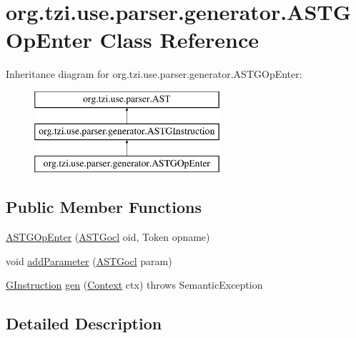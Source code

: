 \hypertarget{classorg_1_1tzi_1_1use_1_1parser_1_1generator_1_1_a_s_t_g_op_enter}{\section{org.\-tzi.\-use.\-parser.\-generator.\-A\-S\-T\-G\-Op\-Enter Class Reference}
\label{classorg_1_1tzi_1_1use_1_1parser_1_1generator_1_1_a_s_t_g_op_enter}
}
Inheritance diagram for org.\-tzi.\-use.\-parser.\-generator.\-A\-S\-T\-G\-Op\-Enter\-:\begin{figure}[H]
\begin{center}
\leavevmode
\includegraphics[height=3.000000cm]{classorg_1_1tzi_1_1use_1_1parser_1_1generator_1_1_a_s_t_g_op_enter}
\end{center}
\end{figure}
\subsection*{Public Member Functions}
\begin{DoxyCompactItemize}
\item 
\hyperlink{classorg_1_1tzi_1_1use_1_1parser_1_1generator_1_1_a_s_t_g_op_enter_a76eb7e51ad98ae0f1089cfa809ac6866}{A\-S\-T\-G\-Op\-Enter} (\hyperlink{classorg_1_1tzi_1_1use_1_1parser_1_1generator_1_1_a_s_t_gocl}{A\-S\-T\-Gocl} oid, Token opname)
\item 
void \hyperlink{classorg_1_1tzi_1_1use_1_1parser_1_1generator_1_1_a_s_t_g_op_enter_abfe9b0fc6c355f39550a581ab8691693}{add\-Parameter} (\hyperlink{classorg_1_1tzi_1_1use_1_1parser_1_1generator_1_1_a_s_t_gocl}{A\-S\-T\-Gocl} param)
\item 
\hyperlink{interfaceorg_1_1tzi_1_1use_1_1gen_1_1assl_1_1statics_1_1_g_instruction}{G\-Instruction} \hyperlink{classorg_1_1tzi_1_1use_1_1parser_1_1generator_1_1_a_s_t_g_op_enter_a5145a7e340b558a1d99b81bf48b2b0e5}{gen} (\hyperlink{classorg_1_1tzi_1_1use_1_1parser_1_1_context}{Context} ctx)  throws Semantic\-Exception 
\end{DoxyCompactItemize}


\subsection{Detailed Description}


